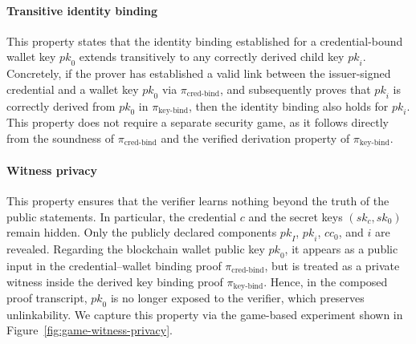 \paragraph{Transitive identity binding}
This property states that the identity binding established for a credential-bound wallet key $\mathit{pk}_0$ extends transitively to any correctly derived child key $\mathit{pk}_i$. Concretely, if the prover has established a valid link between the issuer-signed credential and a wallet key $\mathit{pk}_0$ via $\pi_{\text{cred-bind}}$, and subsequently proves that $\mathit{pk}_i$ is correctly derived from $\mathit{pk}_0$ in $\pi_{\text{key-bind}}$, then the identity binding also holds for $\mathit{pk}_i$. This property does not require a separate security game, as it follows directly from the soundness of $\pi_{\text{cred-bind}}$ and the verified derivation property of $\pi_{\text{key-bind}}$.

\paragraph{Witness privacy}
This property ensures that the verifier learns nothing beyond the truth of the public statements. In particular, the credential $c$ and the secret keys $(sk_c, sk_0)$ remain hidden. Only the publicly declared components $\mathit{pk}_I$, $\mathit{pk}_i$, $\mathit{cc}_0$, and $\mathit{i}$ are revealed. Regarding the blockchain wallet public key $\mathit{pk}_0$, it appears as a public input in the credential–wallet binding proof $\pi_{\text{cred-bind}}$, but is treated as a private witness inside the derived key binding proof $\pi_{\text{key-bind}}$. Hence, in the composed proof transcript, $\mathit{pk}_0$ is no longer exposed to the verifier, which preserves unlinkability. We capture this property via the game-based experiment shown in Figure~\ref{fig:game-witness-privacy}.

